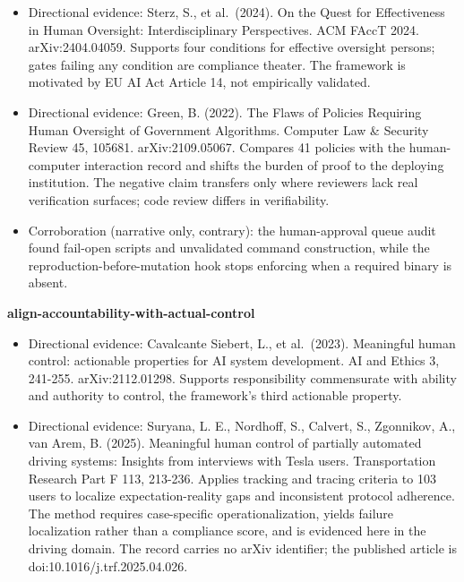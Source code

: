 \begin{itemize}
\tightlist
\item
  Directional evidence: Sterz, S., et al.~(2024). On the Quest for Effectiveness in Human Oversight: Interdisciplinary Perspectives. ACM FAccT 2024. arXiv:2404.04059. Supports four conditions for effective oversight persons; gates failing any condition are compliance theater. The framework is motivated by EU AI Act Article 14, not empirically validated.
\item
  Directional evidence: Green, B. (2022). The Flaws of Policies Requiring Human Oversight of Government Algorithms. Computer Law \& Security Review 45, 105681. arXiv:2109.05067. Compares 41 policies with the human-computer interaction record and shifts the burden of proof to the deploying institution. The negative claim transfers only where reviewers lack real verification surfaces; code review differs in verifiability.
\item
  Corroboration (narrative only, contrary): the human-approval queue audit found fail-open scripts and unvalidated command construction, while the reproduction-before-mutation hook stops enforcing when a required binary is absent.
\end{itemize}

\textbf{align-accountability-with-actual-control}

\begin{itemize}
\tightlist
\item
  Directional evidence: Cavalcante Siebert, L., et al.~(2023). Meaningful human control: actionable properties for AI system development. AI and Ethics 3, 241-255. arXiv:2112.01298. Supports responsibility commensurate with ability and authority to control, the framework's third actionable property.
\item
  Directional evidence: Suryana, L. E., Nordhoff, S., Calvert, S., Zgonnikov, A., van Arem, B. (2025). Meaningful human control of partially automated driving systems: Insights from interviews with Tesla users. Transportation Research Part F 113, 213-236. Applies tracking and tracing criteria to 103 users to localize expectation-reality gaps and inconsistent protocol adherence. The method requires case-specific operationalization, yields failure localization rather than a compliance score, and is evidenced here in the driving domain. The record carries no arXiv identifier; the published article is doi:10.1016/j.trf.2025.04.026.
\end{itemize}
